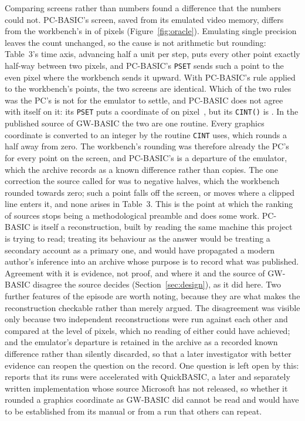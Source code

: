 Comparing screens rather than numbers found a difference that the numbers could not. PC-BASIC's screen, saved from its emulated video memory, differs from the workbench's in \oracleScreenDiffering{} of \oracleScreenPixels{} pixels (Figure~\ref{fig:oracle}). Emulating single precision leaves the count unchanged, so the cause is not arithmetic but rounding: Table~3's time axis, advancing half a unit per step, puts every other point exactly half-way between two pixels, and PC-BASIC's \texttt{PSET} sends such a point to the even pixel where the workbench sends it upward. With PC-BASIC's rule applied to the workbench's points, the two screens are identical. Which of the two rules was the PC's is not for the emulator to settle, and PC-BASIC does not agree with itself on it: its \texttt{PSET} puts a coordinate of \oracleProbeValue{} on pixel~\oracleProbePset{}, but its \texttt{CINT(\oracleProbeValue)} is \oracleProbeCint{}. In the published source of GW-BASIC \citep{gwbasic} the two are one routine. Every graphics coordinate is converted to an integer by the routine \texttt{CINT} uses, which rounds a half away from zero. The workbench's rounding was therefore already the PC's for every point on the screen, and PC-BASIC's is a departure of the emulator, which the archive records as a known difference rather than copies. The one correction the source called for was to negative halves, which the workbench rounded towards zero; such a point falls off the screen, or moves where a clipped line enters it, and none arises in Table~3. This is the point at which the ranking of sources stops being a methodological preamble and does some work. PC-BASIC is itself a reconstruction, built by reading the same machine this project is trying to read; treating its behaviour as the answer would be treating a secondary account as a primary one, and would have propagated a modern author's inference into an archive whose purpose is to record what was published. Agreement with it is evidence, not proof, and where it and the source of GW-BASIC disagree the source decides (Section~\ref{sec:design}), as it did here. Two further features of the episode are worth noting, because they are what makes the reconstruction checkable rather than merely argued. The disagreement was visible only because two independent reconstructions were run against each other and compared at the level of pixels, which no reading of either could have achieved; and the emulator's departure is retained in the archive as a recorded known difference rather than silently discarded, so that a later investigator with better evidence can reopen the question on the record. One question is left open by this: \citet{odum1989} reports that its runs were accelerated with QuickBASIC, a later and separately written implementation whose source Microsoft has not released, so whether it rounded a graphics coordinate as GW-BASIC did cannot be read and would have to be established from its manual or from a run that others can repeat.

